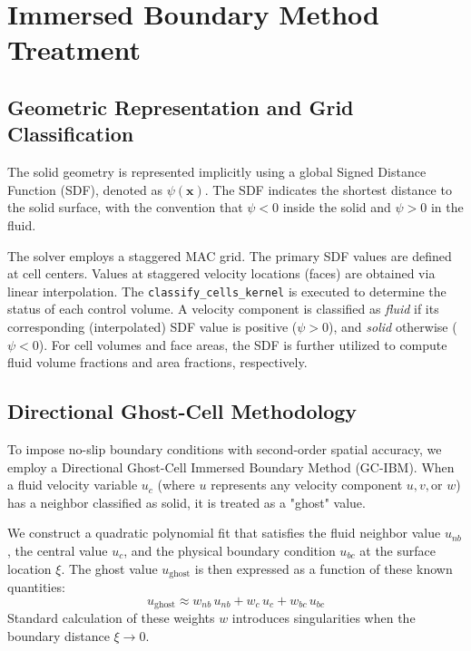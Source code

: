 \documentclass[preprint,12pt]{elsarticle}
\begin{document}
\section{Immersed Boundary Method Treatment}

\subsection{Geometric Representation and Grid Classification}
The solid geometry is represented implicitly using a global Signed Distance Function (SDF), denoted as $\psi(\mathbf{x})$. The SDF indicates the shortest distance to the solid surface, with the convention that $\psi < 0$ inside the solid and $\psi > 0$ in the fluid. 

The solver employs a staggered MAC grid. The primary SDF values are defined at cell centers. Values at staggered velocity locations (faces) are obtained via linear interpolation. The \texttt{classify\_cells\_kernel} is executed to determine the status of each control volume. A velocity component is classified as \textit{fluid} if its corresponding (interpolated) SDF value is positive ($\psi > 0$), and \textit{solid} otherwise ($\psi < 0$). For cell volumes and face areas, the SDF is further utilized to compute fluid volume fractions and area fractions, respectively.


\subsection{Directional Ghost-Cell Methodology}
To impose no-slip boundary conditions with second-order spatial accuracy, we employ a Directional Ghost-Cell Immersed Boundary Method (GC-IBM). When a fluid velocity variable $u_c$ (where $u$ represents any velocity component $u, v, \text{or } w$) has a neighbor classified as solid, it is treated as a "ghost" value. 

We construct a quadratic polynomial fit that satisfies the fluid neighbor value $u_{nb}$, the central value $u_c$, and the physical boundary condition $u_{bc}$ at the surface location $\xi$. The ghost value $u_\mathrm{ghost}$ is then expressed as a function of these known quantities:
\begin{equation}
    u_\mathrm{ghost} \approx w_{nb} \, u_{nb} + w_c \, u_c + w_{bc} \, u_{bc} \label{eq:ghost}
\end{equation}
Standard calculation of these weights $w$ introduces singularities when the boundary distance $\xi \to 0$.
\end{document}
